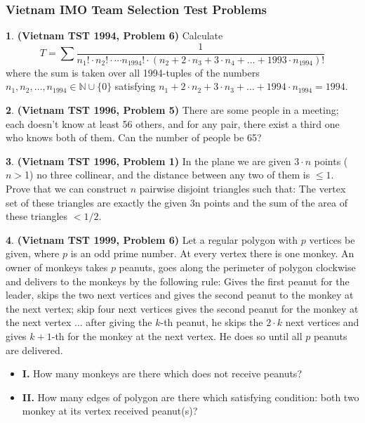 \documentclass{article}
\theoremstyle{definition}
\newtheorem{p}{}
\begin{document}
\subsubsection{Vietnam IMO Team Selection Test Problems}



\begin{p}{\bf(Vietnam TST 1994, Problem 6)}
Calculate 
\[T = \sum \frac{1}{n_1! \cdot n_2! \cdot \cdots n_{1994}! \cdot (n_2 + 2 \cdot n_3 + 3 \cdot n_4 + \ldots + 1993 \cdot n_{1994})!}\]
where the sum is taken over all 1994-tuples of the numbers $n_1, n_2, \ldots, n_{1994} \in \mathbb{N} \cup \{0\}$ satisfying $n_1 + 2 \cdot n_2 + 3 \cdot n_3 + \ldots + 1994 \cdot n_{1994} = 1994.$
\end{p}



\begin{p}{\bf(Vietnam TST 1996, Problem 5)}
There are some people in a meeting; each doesn't know at least 56 others, and for any pair, there exist a third one who knows both of them. Can the number of people be 65?
\end{p}

\begin{p}{\bf(Vietnam TST 1996, Problem 1)}
In the plane we are given $3 \cdot n$ points ($n>$1) no three collinear, and the distance between any two of them  is $\leq 1$. Prove that we can construct $n$ pairwise disjoint triangles such that: The vertex set of these triangles are exactly the given 3n points and the sum of the  area of these triangles $< 1/2$.
\end{p}

\begin{p}{\bf(Vietnam TST 1999, Problem 6)}
Let a regular polygon with $p$ vertices be given, where $p$ is an odd prime number. At every vertex there is one monkey. An owner of monkeys takes $p$ peanuts, goes along the perimeter of polygon clockwise and delivers to the monkeys by the following rule: Gives the first peanut for the leader, skips the two next vertices and gives the second peanut to the monkey at the next vertex; skip four next vertices gives the second peanut for the monkey at the next vertex ... after giving the $k$-th peanut, he skips the $2 \cdot k$ next vertices and gives $k+1$-th for the monkey at the next vertex. He does so until all $p$ peanuts are delivered.
\begin{itemize}
\item {\bf I.} How many monkeys are there which does not receive peanuts?
\item {\bf II.} How many edges of polygon are there which satisfying condition: both two monkey at its vertex received peanut(s)?
\end{itemize}
\end{p}
\end{document}
